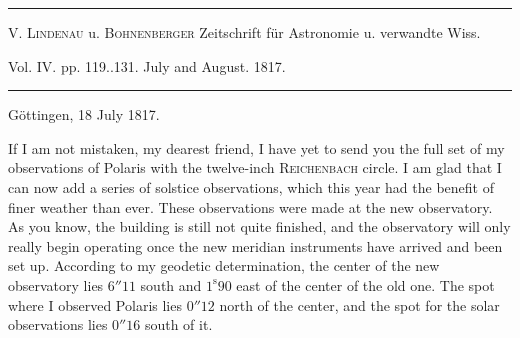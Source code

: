 \clearpage{}\hypertarget{native-398-part-lower}{}\label{native-398-part-lower}
\begin{center}\hrule\vspace{4pt}\fontsize{10}{12}\selectfont
V. \textsc{Lindenau} u. \textsc{Bohnenberger} Zeitschrift für Astronomie u. verwandte Wiss.\par
Vol. IV. pp. 119..131. July and August. 1817.\par\vspace{4pt}\hrule\vspace{4pt}\end{center}
\begin{flushright}Göttingen, 18 July 1817.\end{flushright}
\par\indent If I am not mistaken, my dearest friend, I have yet to send you the full set of my observations of Polaris with the twelve-inch \textsc{Reichenbach} circle. I am glad that I can  now add a series of solstice observations, which this year had the benefit of finer weather than ever. These observations were made at the new observatory. As you know, the building is still not quite finished, and the observatory will only really begin operating once the new meridian instruments have arrived and been set up. According to my geodetic determination, the center of the new observatory lies $6''11$ south and $1^{\mathrm s}90$ east of the center of the old one. The spot where I observed Polaris lies $0''12$ north of the center, and the spot for the solar observations lies $0''16$ south of it.

